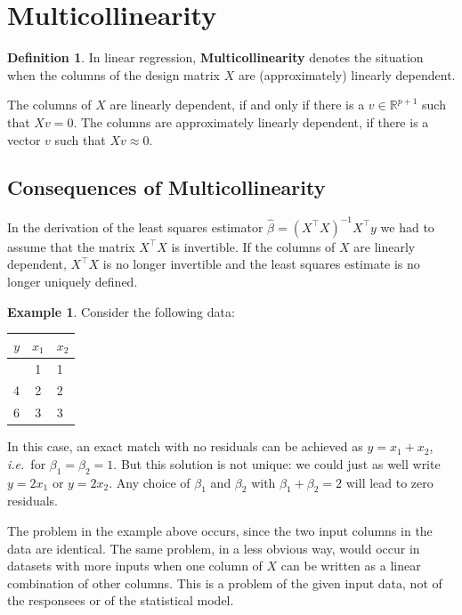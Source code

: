\documentclass[
  a4paper,
]{article}
\theoremstyle{definition}
\newtheorem{definition}{Definition}[section]
\theoremstyle{definition}
\newtheorem{example}{Example}[section]
\theoremstyle{definition}
\theoremstyle{definition}
\theoremstyle{remark}
\begin{document}
\clearpage

\section{Multicollinearity}\label{S15-multicoll}

\begin{definition}
In linear regression, \textbf{Multicollinearity} denotes the situation
when the columns of the design matrix \(X\) are (approximately) linearly
dependent.
\end{definition}

The columns of \(X\) are linearly dependent, if and only if
there is a \(v \in \mathbb{R}^{p+1}\) such that \(X v = 0\). The columns
are approximately linearly dependent, if there is a vector \(v\)
such that \(X v \approx 0\).

\subsection{Consequences of Multicollinearity}\label{consequences-of-multicollinearity}

In the derivation of the least squares estimator \(\hat\beta =
(X^\top X)^{-1} X^\top y\) we had to assume that the matrix \(X^\top X\) is
invertible. If the columns of \(X\) are linearly dependent, \(X^\top X\) is no
longer invertible and the least squares estimate is no longer uniquely
defined.

\begin{example}
Consider the following data:

{\def\LTcaptype{} %
\begin{longtable}[]{@{}rcl@{}}
\toprule\noalign{}
\(y\) & \(x_1\) & \(x_2\) \\
\midrule\noalign{}
\endhead
\bottomrule\noalign{}
\endlastfoot
2 & 1 & 1 \\
4 & 2 & 2 \\
6 & 3 & 3 \\
\end{longtable}
}

In this case, an exact match with no residuals can be achieved
as \(y = x_1 + x_2\), \emph{i.e.}~for \(\beta_1 = \beta_2 = 1\). But this solution
is not unique: we could just as well write \(y = 2 x_1\) or \(y = 2 x_2\).
Any choice of \(\beta_1\) and \(\beta_2\) with \(\beta_1 + \beta_2 = 2\) will
lead to zero residuals.
\end{example}

The problem in the example above occurs, since the two input columns in the
data are identical. The same problem, in a less obvious way, would occur in
datasets with more inputs when one column of \(X\) can be written as a linear
combination of other columns. This is a problem of the given
input data, not of the responsees or of the statistical model.
\end{document}
